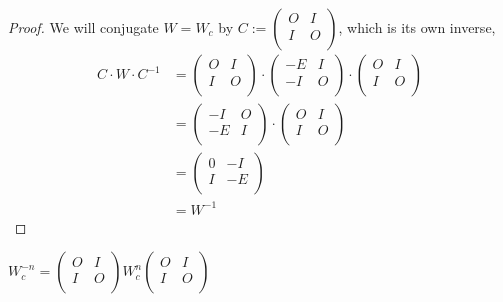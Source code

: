 \begin{proof}
  We will conjugate $W=W_{c}$ by
  $C := \left(\begin{smallmatrix} O & I \\ I & O \\\end{smallmatrix}\right)$,
  which is its own inverse,
  \[
  \begin{aligned}
  C \cdot W \cdot C^{-1}
  & =
  \left(
  \begin{array}{cc}
    O & I \\
    I & O \\
  \end{array}
  \right)
  \cdot
  \left(
  \begin{array}{cc}
    -E & I \\
    -I & O \\
  \end{array}
  \right)
  \cdot
  \left(
  \begin{array}{cc}
    O & I \\
    I & O \\
  \end{array}
  \right) \\
  & =
  \left(
  \begin{array}{cc}
    -I & O \\
    -E & I \\
  \end{array}
  \right)
  \cdot
  \left(
  \begin{array}{cc}
    O & I \\
    I & O \\
  \end{array}
  \right) \\
  & =
  \left(
  \begin{array}{cc}
    0 & -I \\
    I & -E \\
  \end{array}
  \right) \\
  & =
  W^{-1}
  \end{aligned}
  \]
\end{proof}

\begin{corollary}
  $W_{c}^{-n} =
  \left(\begin{smallmatrix} O & I \\ I & O \\\end{smallmatrix}\right)
  W_{c}^{n}
  \left(\begin{smallmatrix} O & I \\ I & O \\\end{smallmatrix}\right)$
\end{corollary}

